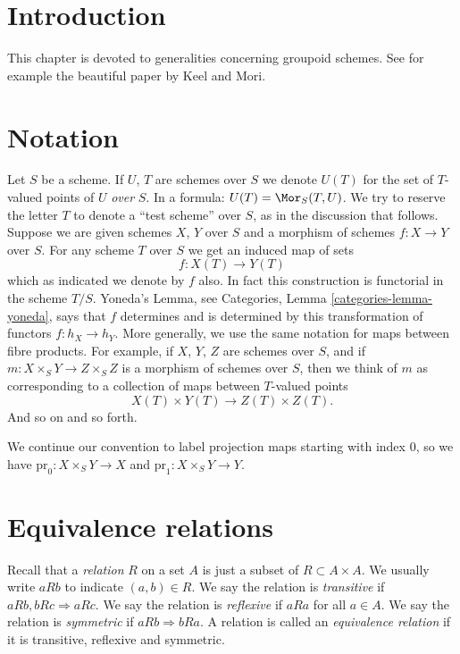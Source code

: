 \section{Introduction}
\label{groupoids-section-introduction}
This chapter is devoted to generalities concerning groupoid schemes.
See for example the beautiful paper \cite{K-M} by Keel and Mori.

\section{Notation}
\label{groupoids-section-notation}
Let $S$ be a scheme. If $U$, $T$ are schemes over $S$ we denote
$U(T)$ for the set of $T$-valued points of $U$ {\it over} $S$. In a formula:
$U(T) = \Mor_S(T, U)$. We try to reserve the letter $T$ to denote
a ``test scheme'' over $S$, as in the discussion that follows.
Suppose we are given schemes $X$, $Y$ over
$S$ and a morphism of schemes $f : X \to Y$ over $S$.
For any scheme $T$ over $S$ we get an induced map of sets
$$
f : X(T) \longrightarrow Y(T)
$$
which as indicated we denote by $f$ also. In fact this construction
is functorial in the scheme $T/S$. Yoneda's Lemma, see Categories,
Lemma \ref{categories-lemma-yoneda}, says that $f$ determines and is
determined by this transformation of functors $f : h_X \to h_Y$.
More generally, we use the same notation for maps between fibre
products. For example, if
$X$, $Y$, $Z$ are schemes over $S$, and if
$m : X \times_S Y \to Z \times_S Z$ is
a morphism of schemes over $S$, then we think of $m$ as corresponding
to a collection of maps between $T$-valued points
$$
X(T) \times Y(T) \longrightarrow Z(T) \times Z(T).
$$
And so on and so forth.

\medskip\noindent
We continue our convention to label projection maps starting with
index $0$, so we have $\text{pr}_0 : X \times_S Y \to X$ and
$\text{pr}_1 : X \times_S Y \to Y$.

\section{Equivalence relations}
\label{groupoids-section-equivalence-relations}
Recall that a {\it relation} $R$ on a set $A$ is just a subset
of $R \subset A \times A$. We usually write $a R b$ to indicate
$(a, b) \in R$. We say the relation is {\it transitive} if
$a R b, b R c \Rightarrow a R c$. We say the relation is
{\it reflexive} if $a R a$ for all $a \in A$. We say the relation is
{\it symmetric} if $a R b \Rightarrow b R a$.
A relation is called an {\it equivalence relation} if
it is transitive, reflexive and symmetric.

